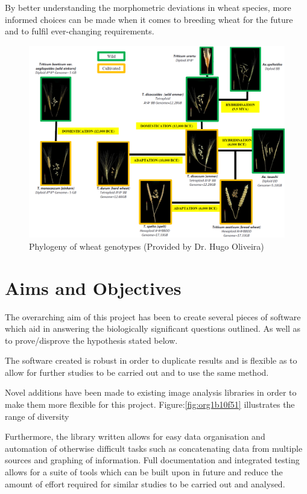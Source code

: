 \documentclass[11pt]{report}
\begin{document}
By better understanding the morphometric deviations in wheat species, more informed choices can be made when it comes to breeding wheat for the future and to fulfil ever-changing requirements.

\clearpage

\begin{figure}[htbp]
\centering
\includegraphics[width=17cm]{./images/philotree.png}
\caption{\label{fig:orgd7b7b81}
Phylogeny of wheat genotypes (Provided by Dr. Hugo Oliveira)}
\end{figure}

\section{Aims and Objectives}
\label{sec:orgc24be7d}

The overarching aim of this project has been to create several pieces of software which aid in answering the biologically significant questions outlined. As well as to prove/disprove the hypothesis stated below.

The software created is robust in order to duplicate results and is flexible as to allow for further studies to be carried out and to use the same method.

Novel additions have been made to existing image analysis libraries in order to make them more flexible for this project. Figure:\ref{fig:org1b10f51} illustrates the range of diversity

Furthermore, the library written allows for easy data organisation and automation of otherwise difficult tasks such as concatenating data from multiple sources and graphing of information. Full documentation and integrated testing allows for a suite of tools which can be built upon in future and reduce the amount of effort required for similar studies to be carried out and analysed.
\end{document}
